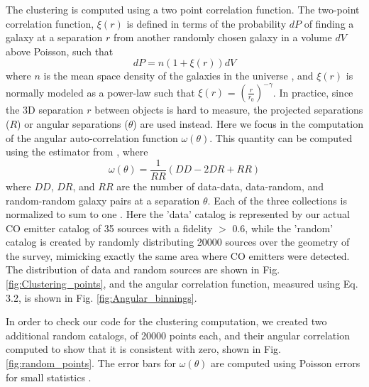 The clustering is computed using a two point correlation function. The two-point correlation function, $ \xi(r)$ is defined in terms of the probability $dP$ of finding a galaxy at a separation $r$ from another randomly chosen galaxy in a volume $dV$ above Poisson, such that \begin{equation}
    dP = n(1 + \xi(r))dV
\end{equation} where $n$ is the mean space density of the galaxies in the universe \cite{hickox2011clustering}, and $\xi(r)$ is normally modeled as a power-law such that $\xi(r)$ = $(\frac{r}{r_0})^{-\gamma}$. In practice, since the 3D separation $r$ between objects is hard to measure, the projected separations ($R$) or angular separations ($\theta$) are used instead. Here we focus in the computation of the angular auto-correlation function $\omega(\theta)$. This quantity can be computed using the estimator from \cite{1993ApJ...412...64L}, where 
\begin{equation}
   \omega(\theta) = \frac{1}{RR}(DD-2DR + RR) 
\end{equation}\label{eq:Function} where $DD$, $DR$, and $RR$ are the number of data-data, data-random, and random-random galaxy pairs at a separation $\theta$. Each of the three collections is normalized to sum to one \cite{hickox2011clustering}. Here the 'data' catalog is represented by our actual CO emitter catalog of 35 sources with a fidelity $>$ 0.6, while the 'random' catalog is created by randomly distributing 20000 sources over the geometry of the survey, mimicking exactly the same area where CO emitters were detected. The distribution of data and random sources are shown in Fig. \ref{fig:Clustering_points}, and the angular correlation function, measured using Eq. 3.2, is shown in Fig. \ref{fig:Angular_binnings}.

In order to check our code for the clustering computation, we created two additional random catalogs, of 20000 points each, and their angular correlation computed to show that it is consistent with zero, shown in Fig.\ref{fig:random_points}. The error bars for $\omega(\theta)$ are computed using Poisson errors for small statistics \cite{1986ApJ...303..336G}.

